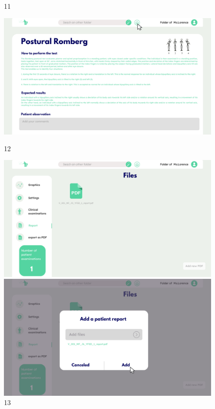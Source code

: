 \begin{figure}[H]
\begin{minipage}{0.3\textwidth}
        \caption*{11}
    \end{minipage}
    \begin{minipage}{0.3\textwidth}
        \centering
        \includegraphics[width=\textwidth]{images/Prototype/12.png}
        \caption*{12}
    \end{minipage}
    \begin{minipage}{0.3\textwidth}
        \centering
        \includegraphics[width=\textwidth]{images/Prototype/13.png}
        \caption*{13}
    \end{minipage}
    \begin{minipage}{0.3\textwidth}
        \centering
        \includegraphics[width=\textwidth]{images/Prototype/14.png}

\end{minipage}
\end{figure}
